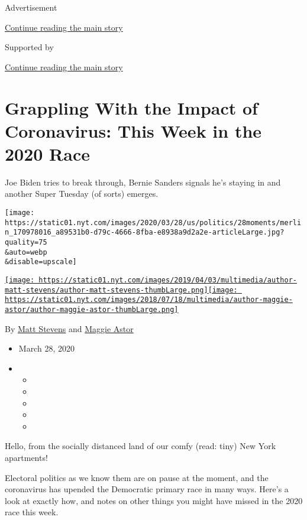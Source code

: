 Advertisement

\protect\hyperlink{after-top}{Continue reading the main story}

Supported by

\protect\hyperlink{after-sponsor}{Continue reading the main story}

\hypertarget{grappling-with-the-impact-of-coronavirus-this-week-in-the-2020-race}{%
\section{Grappling With the Impact of Coronavirus: This Week in the 2020
Race}\label{grappling-with-the-impact-of-coronavirus-this-week-in-the-2020-race}}

Joe Biden tries to break through, Bernie Sanders signals he's staying in
and another Super Tuesday (of sorts) emerges.

\texttt{[image: https://static01.nyt.com/images/2020/03/28/us/politics/28moments/merlin\_170978016\_a89531b0-d79c-4666-8fba-e8938a9d2a2e-articleLarge.jpg?quality=75\\\&auto=webp\\\&disable=upscale]}

\href{https://www.nytimes.com/by/matt-stevens}{\texttt{[image: https://static01.nyt.com/images/2019/04/03/multimedia/author-matt-stevens/author-matt-stevens-thumbLarge.png]}}\href{https://www.nytimes.com/by/maggie-astor}{\texttt{[image: https://static01.nyt.com/images/2018/07/18/multimedia/author-maggie-astor/author-maggie-astor-thumbLarge.png]}}

By \href{https://www.nytimes.com/by/matt-stevens}{Matt Stevens} and
\href{https://www.nytimes.com/by/maggie-astor}{Maggie Astor}

\begin{itemize}
\item
  March 28, 2020
\item
  \begin{itemize}
  \item
  \item
  \item
  \item
  \item
  \end{itemize}
\end{itemize}

Hello, from the socially distanced land of our comfy (read: tiny) New
York apartments!

Electoral politics as we know them are on pause at the moment, and the
coronavirus has upended the Democratic primary race in many ways. Here's
a look at exactly how, and notes on other things you might have missed
in the 2020 race this week.

